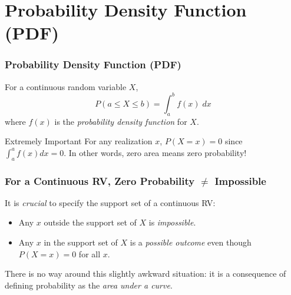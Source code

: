 
\section{Probability Density Function (PDF)}
\begin{frame}
\frametitle{Probability Density Function (PDF)}
For a continuous random variable $X$, 
	$$P(a \leq X \leq b) = \int_a^b f(x) \; dx$$
where $f(x)$ is the \emph{probability density function} for $X$. 
\vspace{2em}

\begin{alertblock}{Extremely Important}
For any realization $x$, $P(X=x) = 0$ since $\int_a^a f(x) dx = 0$.
In other words, zero area means zero probability!
\end{alertblock}
\end{frame}
\begin{frame}
  \frametitle{For a Continuous RV, Zero Probability $\neq$ Impossible}

    It is \emph{crucial} to specify the support set of a continuous RV:
  \begin{itemize}
    \item Any $x$ outside the support set of $X$ is \emph{impossible}.
    \item Any $x$ in the support set of $X$ is a \emph{possible outcome} even though $P(X=x) = 0$ for all $x$.
  \end{itemize}

  \vspace{1em}

  \alert{There is no way around this slightly awkward situation: it is a consequence of defining probability as the \emph{area under a curve}.}
  
\end{frame}
